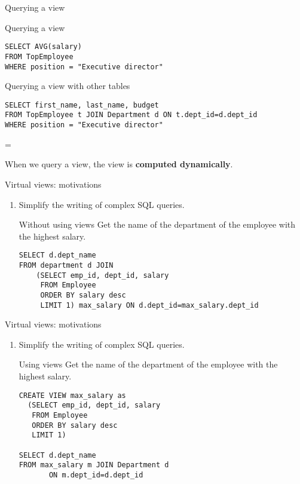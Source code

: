 \documentclass[xcolor=table]{beamer}
\newenvironment{warning}
  {\par\begin{mdframed}[linewidth=2pt,linecolor=darkred]%
    \begin{list}{}{\leftmargin=1cm
                   \labelwidth=\leftmargin}\item[\Large\ding{43}]}
  {\end{list}\end{mdframed}\par}
\begin{document}
\begin{frame}[fragile]{Querying a view}
  \begin{block}{Querying a view}
    \footnotesize
\begin{verbatim}
SELECT AVG(salary)
FROM TopEmployee
WHERE position = "Executive director"
\end{verbatim}
  \end{block}
\vfill

\begin{exampleblock}{Querying a view with other tables}
  \footnotesize
\begin{verbatim}
SELECT first_name, last_name, budget
FROM TopEmployee t JOIN Department d ON t.dept_id=d.dept_id
WHERE position = "Executive director"
\end{verbatim}
\end{exampleblock}

  \vfill
  \begin{warning}
    When we query a view, the view is {\bf computed dynamically}.
  \end{warning}
\end{frame}

\begin{frame}[fragile]{Virtual views: motivations}
  \begin{enumerate}
    \item Simplify the writing of complex SQL queries.
    \vfill
    \begin{block}{Without using views}
      Get the name of the department of the employee 
      with the highest salary.
\footnotesize
\begin{verbatim}
SELECT d.dept_name 
FROM department d JOIN
    (SELECT emp_id, dept_id, salary
     FROM Employee
     ORDER BY salary desc 
     LIMIT 1) max_salary ON d.dept_id=max_salary.dept_id
\end{verbatim}
\end{block}
  \end{enumerate}
\end{frame}

\begin{frame}[fragile]{Virtual views: motivations}
  \begin{enumerate}
    \item Simplify the writing of complex SQL queries.
    \vfill
    \begin{block}{Using views}
      Get the name of the department of the employee 
      with the highest salary.
\footnotesize
\begin{verbatim}
CREATE VIEW max_salary as
  (SELECT emp_id, dept_id, salary
   FROM Employee
   ORDER BY salary desc 
   LIMIT 1)

SELECT d.dept_name
FROM max_salary m JOIN Department d 
       ON m.dept_id=d.dept_id
\end{verbatim}
\end{block}
  \end{enumerate}
\end{frame}
\end{document}
